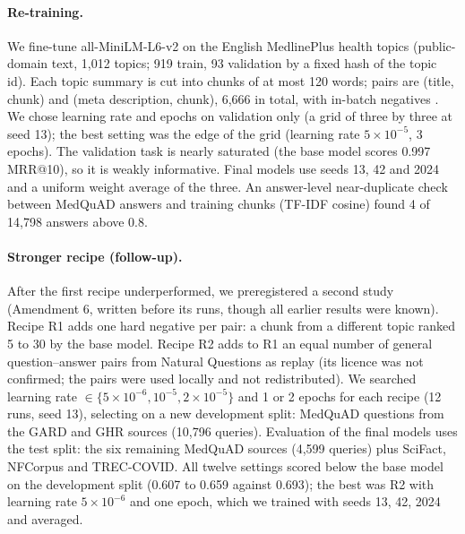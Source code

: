 \documentclass[11pt]{article}
\begin{document}
\paragraph{Re-training.} We fine-tune all-MiniLM-L6-v2 on the English MedlinePlus health topics (public-domain text, 1,012 topics; 919 train, 93 validation by a fixed hash of the topic id). Each topic summary is cut into chunks of at most 120 words; pairs are (title, chunk) and (meta description, chunk), 6,666 in total, with in-batch negatives \citep{henderson2017smartreply}. We chose learning rate and epochs on validation only (a grid of three by three at seed 13); the best setting was the edge of the grid (learning rate $5\times10^{-5}$, 3 epochs). The validation task is nearly saturated (the base model scores 0.997 MRR@10), so it is weakly informative. Final models use seeds 13, 42 and 2024 and a uniform weight average of the three. An answer-level near-duplicate check between MedQuAD answers and training chunks (TF-IDF cosine) found 4 of 14,798 answers above 0.8.

\paragraph{Stronger recipe (follow-up).} After the first recipe underperformed, we preregistered a second study (Amendment 6, written before its runs, though all earlier results were known). Recipe R1 adds one hard negative per pair: a chunk from a different topic ranked 5 to 30 by the base model. Recipe R2 adds to R1 an equal number of general question--answer pairs from Natural Questions as replay (its licence was not confirmed; the pairs were used locally and not redistributed). We searched learning rate $\in\{5\times10^{-6},10^{-5},2\times10^{-5}\}$ and 1 or 2 epochs for each recipe (12 runs, seed 13), selecting on a new development split: MedQuAD questions from the GARD and GHR sources (10,796 queries). Evaluation of the final models uses the test split: the six remaining MedQuAD sources (4,599 queries) plus SciFact, NFCorpus and TREC-COVID. All twelve settings scored below the base model on the development split (0.607 to 0.659 against 0.693); the best was R2 with learning rate $5\times10^{-6}$ and one epoch, which we trained with seeds 13, 42, 2024 and averaged.
\end{document}
